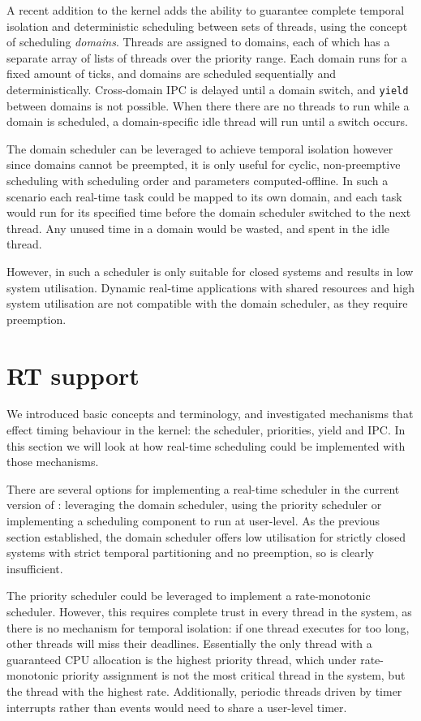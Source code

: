 A recent addition to the \selfour kernel adds the ability to guarantee complete temporal isolation and deterministic scheduling between sets of threads, using the concept of scheduling \emph{domains}.
Threads are assigned to domains, each of which has a separate array of lists of threads over the priority range.
Each domain runs for a fixed amount of ticks, and domains are scheduled sequentially and deterministically.
Cross-domain \gls{IPC} is delayed until a domain switch, and \texttt{yield} between domains is not
possible. When there there are no threads to run while a domain is scheduled, a domain-specific idle thread will run until a switch occurs.

The domain scheduler can be leveraged to achieve temporal isolation however since domains cannot be
preempted, it is only useful for cyclic, non-preemptive scheduling with scheduling order and
parameters computed-offline.
In such a scenario each real-time task could be mapped to its own domain, and each task would run for its specified time before the domain scheduler switched to the next thread.
Any unused time in a domain would be wasted, and spent in the idle thread.

However, in such a scheduler is only suitable for closed systems and results in low system utilisation.
Dynamic real-time applications with shared resources and high system utilisation are not compatible
with the domain scheduler, as they require preemption.

\section{RT support}

We introduced basic \selfour concepts and terminology, and investigated mechanisms that effect
timing behaviour in the kernel: the scheduler, priorities, yield and IPC. 
In this section we will look at how real-time scheduling could be implemented with those mechanisms.

There are several options for implementing a real-time scheduler in the current version of \selfour: leveraging the domain scheduler, using the priority scheduler or implementing a scheduling component to run at user-level. 
As the previous section established, the domain scheduler offers low utilisation for strictly closed
systems with strict temporal partitioning and no preemption, so is clearly insufficient.

The priority scheduler could be leveraged to implement a rate-monotonic scheduler.
However, this requires complete trust in every thread in the system, as there is no mechanism for temporal isolation: if one thread executes for too long, other threads will miss their deadlines.
Essentially the only thread with a guaranteed CPU allocation is the highest priority thread, which under rate-monotonic priority assignment is not the most critical thread in the system, but the thread with the highest rate.
Additionally, periodic threads driven by timer interrupts rather than events would need to share a user-level timer.

